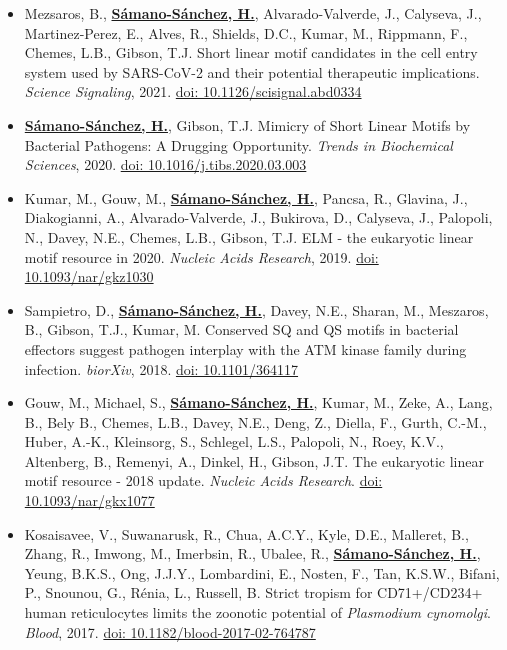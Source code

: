\documentclass[11pt,a4paper,sans]{moderncv} %
\begin{document}
\begin{itemize}
  \item Mezsaros, B., \textbf{\underline{S\'amano-S\'anchez, H.}}, Alvarado-Valverde, J., Calyseva, J., Martinez-Perez, E., Alves, R., Shields, D.C., Kumar, M., Rippmann, F., Chemes, L.B., Gibson, T.J. Short linear motif candidates in the cell entry system used by SARS-CoV-2 and their potential therapeutic implications. \textit{Science Signaling}, 2021. \href{https://doi.org/10.1126/scisignal.abd0334}{doi: 10.1126/scisignal.abd0334}
  \item \textbf{\underline{S\'amano-S\'anchez, H.}}, Gibson, T.J. Mimicry of Short Linear Motifs by Bacterial Pathogens: A Drugging Opportunity. \textit{Trends in Biochemical Sciences}, 2020. \href{https://doi.org/10.1016/j.tibs.2020.03.003}{doi: 10.1016/j.tibs.2020.03.003}
  \item Kumar, M., Gouw, M., \textbf{\underline{S\'amano-S\'anchez, H.}}, Pancsa, R., Glavina, J., Diakogianni, A., Alvarado-Valverde, J., Bukirova, D., Calyseva, J., Palopoli, N., Davey, N.E., Chemes, L.B., Gibson, T.J. ELM - the eukaryotic linear motif resource in 2020. \textit{Nucleic Acids Research}, 2019. \href{https://doi.org/10.1093/nar/gkz1030}{doi: 10.1093/nar/gkz1030}
  \item Sampietro, D., \textbf{\underline{S\'amano-S\'anchez, H.}}, Davey, N.E., Sharan, M., Meszaros, B., Gibson, T.J., Kumar, M. Conserved SQ and QS motifs in bacterial effectors suggest pathogen interplay with the ATM kinase family during infection. \textit{biorXiv}, 2018. \href{https://doi.org/10.1101/364117}{doi: 10.1101/364117}
  \item Gouw, M., Michael, S., \textbf{\underline{S\'amano-S\'anchez, H.}}, Kumar, M., Zeke, A., Lang, B., Bely B., Chemes, L.B., Davey, N.E., Deng, Z., Diella, F., Gurth, C.-M., Huber, A.-K., Kleinsorg, S., Schlegel, L.S., Palopoli, N., Roey, K.V., Altenberg, B., Remenyi, A., Dinkel, H., Gibson, J.T. The eukaryotic linear motif resource - 2018 update. \textit{Nucleic Acids Research}. \href{https://doi.org/10.1093/nar/gkx1077}{doi: 10.1093/nar/gkx1077}
  \item Kosaisavee, V., Suwanarusk, R., Chua, A.C.Y., Kyle, D.E., Malleret, B., Zhang, R., Imwong, M., Imerbsin, R., Ubalee, R., \textbf{\underline{S\'amano-S\'anchez, H.}}, Yeung, B.K.S., Ong, J.J.Y., Lombardini, E., Nosten, F., Tan, K.S.W., Bifani, P., Snounou, G., R\'enia, L., Russell, B. Strict tropism for CD71+/CD234+ human reticulocytes limits the zoonotic potential of \textit{Plasmodium cynomolgi}. \textit{Blood}, 2017. \href{https://doi.org/10.1182/blood-2017-02-764787}{doi: 10.1182/blood-2017-02-764787}

\end{itemize}
\end{document}
